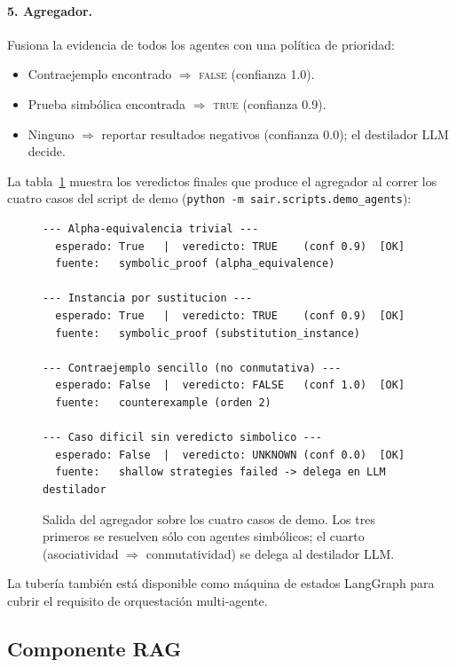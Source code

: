 \documentclass{article}
\begin{document}
\paragraph{5. Agregador.} Fusiona la evidencia de todos los agentes con una pol\'itica de prioridad:
\begin{itemize}[itemsep=1pt]
  \item Contraejemplo encontrado $\Rightarrow$ \textsc{false} (confianza 1.0).
  \item Prueba simb\'olica encontrada $\Rightarrow$ \textsc{true} (confianza 0.9).
  \item Ninguno $\Rightarrow$ reportar resultados negativos (confianza 0.0); el destilador LLM decide.
\end{itemize}

La tabla~\ref{fig:demo-aggregator} muestra los veredictos finales que produce el agregador al correr los cuatro casos del script de demo (\texttt{python -m sair.scripts.demo\_agents}):

\begin{figure}[h]
\centering
\begin{minipage}{0.95\linewidth}
\begin{verbatim}
--- Alpha-equivalencia trivial ---
  esperado: True   |  veredicto: TRUE    (conf 0.9)  [OK]
  fuente:   symbolic_proof (alpha_equivalence)

--- Instancia por sustitucion ---
  esperado: True   |  veredicto: TRUE    (conf 0.9)  [OK]
  fuente:   symbolic_proof (substitution_instance)

--- Contraejemplo sencillo (no conmutativa) ---
  esperado: False  |  veredicto: FALSE   (conf 1.0)  [OK]
  fuente:   counterexample (orden 2)

--- Caso dificil sin veredicto simbolico ---
  esperado: False  |  veredicto: UNKNOWN (conf 0.0)  [OK]
  fuente:   shallow strategies failed -> delega en LLM destilador
\end{verbatim}
\end{minipage}
\caption{Salida del agregador sobre los cuatro casos de demo. Los tres primeros se resuelven s\'olo con agentes simb\'olicos; el cuarto (asociatividad $\Rightarrow$ conmutatividad) se delega al destilador LLM.}
\label{fig:demo-aggregator}
\end{figure}

La tuber\'ia tambi\'en est\'a disponible como m\'aquina de estados LangGraph para cubrir el requisito de orquestaci\'on multi-agente.

\subsection{Componente RAG}
\label{sec:rag}
\end{document}
